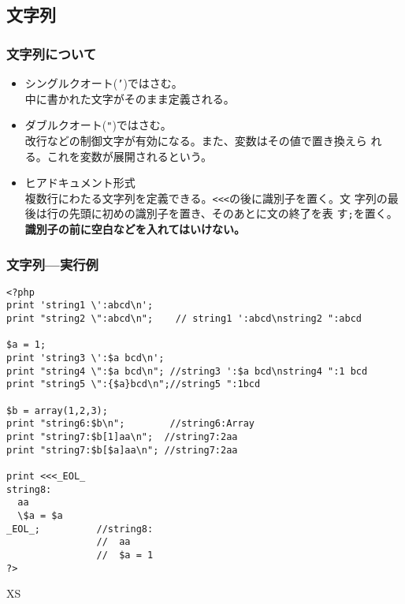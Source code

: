 \subsection{文字列}
\begin{frame}[containsverbatim]
\frametitle{文字列について}
\begin{itemize}
 \item シングルクオート(\texttt{'})ではさむ。\\
   中に書かれた文字がそのまま定義される。
 \item ダブルクオート(\verb+"+)ではさむ。\\%
       改行などの制御文字が有効になる。また、変数はその値で置き換えら
       れる。これを変数が展開されるという。
 \item ヒアドキュメント形式\\
   複数行にわたる文字列を定義できる。\texttt{<<<}の後に識別子を置く。文
       字列の最後は行の先頭に初めの識別子を置き、そのあとに文の終了を表
       す\texttt{;}を置く。{\bfseries 識別子の前に空白などを入れてはいけない。}
\end{itemize}
\end{frame}
\begin{frame}[containsverbatim]
\frametitle{文字列---実行例}
{\scriptsize
\begin{verbatim}
<?php
print 'string1 \':abcd\n';
print "string2 \":abcd\n";    // string1 ':abcd\nstring2 ":abcd

$a = 1;
print 'string3 \':$a bcd\n';
print "string4 \":$a bcd\n"; //string3 ':$a bcd\nstring4 ":1 bcd
print "string5 \":{$a}bcd\n";//string5 ":1bcd

$b = array(1,2,3);
print "string6:$b\n";        //string6:Array
print "string7:$b[1]aa\n";  //string7:2aa
print "string7:$b[$a]aa\n"; //string7:2aa

print <<<_EOL_
string8:
  aa
  \$a = $a
_EOL_;          //string8:
                //  aa
                //  $a = 1
?>
\end{verbatim}
}XS
\end{frame}
